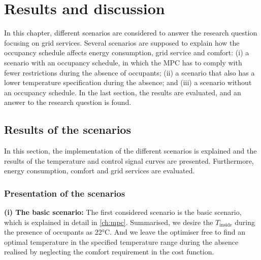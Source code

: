 \chapter{Results and discussion}
\label{ch:results}
In this chapter, different scenarios are considered to answer the research question focusing on grid services. Several scenarios are supposed to explain how the occupancy schedule affects energy consumption, grid service and comfort: (i) a scenario with an occupancy schedule, in which the MPC has to comply with fewer restrictions during the absence of occupants; (ii) a scenario that also has a lower temperature specification during the absence; and (iii) a scenario without an occupancy schedule. In the last section, the results are evaluated, and an answer to the research question is found.

\section{Results of the scenarios}
\label{sec:ResultsScenarios}
In this section, the implementation of the different scenarios is explained and the results of the temperature and control signal curves are presented. Furthermore, energy consumption, comfort and grid services are evaluated.  

\subsection{Presentation of the scenarios}
\label{subsec:Presentation of the scenarios}

\textbf{(i) The basic scenario:}\newline
The first considered scenario is the basic scenario, which is explained in detail in \autoref{ch:mpc}. Summarised, we desire the $T_\text{inside}$ during the presence of occupants as 22°C. And we leave the optimiser free to find an optimal temperature in the specified temperature range during the absence realised by neglecting the comfort requirement in the cost function.\newline

